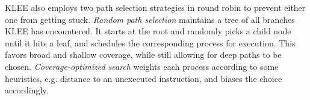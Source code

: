 %
KLEE also employs two path selection strategies in round robin to
prevent either one from getting stuck.
%
\emph{Random path selection} maintains a tree of all branches KLEE has
encountered.
%
It starts at the root and randomly picks a child node until it hits a
leaf, and schedules the corresponding process for execution.
%
This favors broad and shallow coverage, while still allowing for deep
paths to be chosen.
%
\emph{Coverage-optimized search} weights each process according to some
heuristics, e.g. distance to an unexecuted instruction, and biases the
choice accordingly.
%



